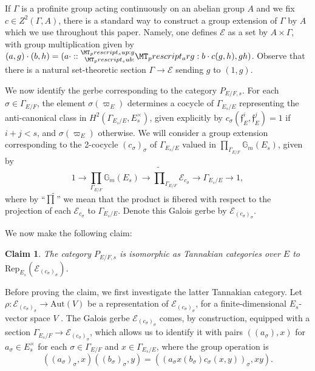 \documentclass[11pt]{amsart}
\newtheorem{claim}[thm]{Claim}
\theoremstyle{definition}
\newcommand{\mc}{\mathcal}
\newcommand{\mf}{\mathfrak}
\begin{document}
If $\Gamma$ is a profinite group acting continuously on an abelian group $A$ and we fix $c \in Z^{2}(\Gamma,A)$, there is a standard way to construct a group extension of $\Gamma$ by $A$ which we use throughout this paper. Namely, one defines $\mc{E}$ as a set by $A \times \Gamma$, with group multiplication given by $(a,g) \cdot (b,h) = (a \cdot \prescript{g}{}b \cdot c(g,h), gh)$. Observe that there is a natural set-theoretic section $\Gamma \to \mc{E}$ sending $g$ to $(1,g)$.

We now identify the gerbe corresponding to the category $P_{E/F, s}$. For each $\sigma \in \Gamma_{E/F}$, the element $\sigma(\varpi_{E})$ determines a cocycle of $\Gamma_{E_{s}/E}$ representing the anti-canonical class in $H^{2}(\Gamma_{E_{s}/E}, E_{s}^{\times})$, given explicitly by $c_{\sigma}(\mf{f}_{E}^{i}, \mf{f}_{E}^{j}) = 1$ if $i+j < s$, and $\sigma(\varpi_{E})$ otherwise. We will consider a group extension corresponding to the 2-cocycle $(c_{\sigma})_{\sigma}$ of $\Gamma_{E_{s}/E}$ valued in $\prod_{\Gamma_{E/F}} \mathbb{G}_{m}(E_{s})$, given by 
$$1 \to  \prod_{\Gamma_{E/F}} \mathbb{G}_{m}(E_{s}) \to  \widetilde{\prod}_{\Gamma_{E/F}} \mc{E}_{c_{\sigma}} \to \Gamma_{E_{s}/E} \to 1,$$ where by ``$\widetilde{\prod}$'' we mean that the product is fibered with respect to the projection of each $\mc{E}_{c_{\sigma}}$ to $\Gamma_{E_{s}/E}$.  Denote this Galois gerbe by $\mc{E}_{(c_{\sigma})_{\sigma}}$.

We now make the following claim:
\begin{claim}
The category $P_{E/F, s}$ is isomorphic as Tannakian categories over $E$ to $\text{Rep}_{E_{s}}(\mc{E}_{(c_{\sigma})_{\sigma}})$.
\end{claim}
Before proving the claim, we first investigate the latter Tannakian category. Let $\rho \colon \mc{E}_{(c_{\sigma})_{\sigma}} \to \text{Aut}(V)$ be a representation of $\mc{E}_{(c_{\sigma})_{\sigma}}$, for a finite-dimensional $E_{s}$-vector space $V$ . The Galois gerbe $\mc{E}_{(c_{\sigma})_{\sigma}}$ comes, by construction, equipped with a section $\Gamma_{E_{s}/F} \to \mc{E}_{(c_{\sigma})_{\sigma}}$, which allows us to identify it with pairs $((a_{\sigma}), x)$ for $a_{\sigma} \in E_{s}^{\times}$ for each $\sigma \in \Gamma_{E/F}$ and $x \in \Gamma_{E_{s}/E}$, where the group operation is $$((a_{\sigma})_{\sigma}, x)((b_{\sigma})_{\sigma},y) = ((a_{\sigma}x(b_{\sigma})c_{\sigma}(x,y))_{\sigma}, xy).$$
\end{document}
